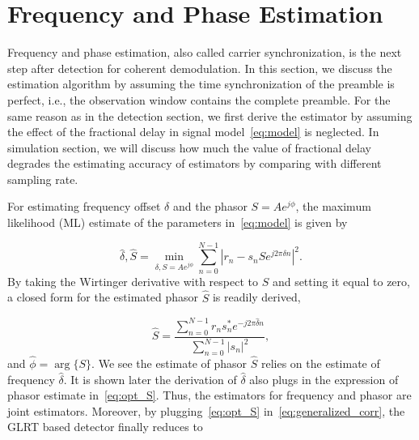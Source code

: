 \section{Frequency and Phase Estimation}%
\label{sec:freq_est}

Frequency and phase estimation, also called carrier synchronization, is the next step after detection for coherent demodulation.
In this section, we discuss the estimation algorithm by assuming the time synchronization of the preamble is perfect, i.e., 
the observation window contains the complete preamble. For the same reason as in the detection section, we first derive the estimator
by assuming the effect of the fractional delay in signal model~\eqref{eq:model} is neglected.
In simulation section, we will discuss how much the value of fractional delay degrades the estimating accuracy of estimators by
comparing with different sampling rate.

For estimating frequency offset $\delta$ and the phasor $S=Ae^{j\phi}$, the maximum likelihood (ML) estimate of the parameters in~\eqref{eq:model} is given by

\begin{equation}
\label{eq:ML_f_S}
  \hat{\delta},\hat{S}=\min_{\delta,S=Ae^{j\phi}}\sum_{n=0}^{N-1}|r_n-s_nSe^{j2\pi\delta n}|^{2}.
\end{equation}
By taking the Wirtinger derivative with respect to $S$ and setting it equal to zero, a 
closed form for the estimated phasor $\hat{S}$ is readily derived,

\begin{equation}
    \label{eq:opt_S}
    \hat{S}=\frac{\sum_{n=0}^{N-1}{r_{n}s_n^{*}e^{-j2\pi\hat{\delta} n}}}{\sum_{n=0}^{N-1}|s_{n}|^2},
  \end{equation}
and $\hat{\phi}=\arg\{S\}$. We see the estimate of phasor $\hat{S}$ relies on the estimate of frequency $\hat{\delta}$.
It is shown later the derivation of $\hat{\delta}$ also plugs in the expression of phasor estimate in~\eqref{eq:opt_S}. Thus, the estimators for frequency and phasor are
joint estimators. Moreover, by plugging~\eqref{eq:opt_S} in~\eqref{eq:generalized_corr}, the GLRT based detector finally reduces to

